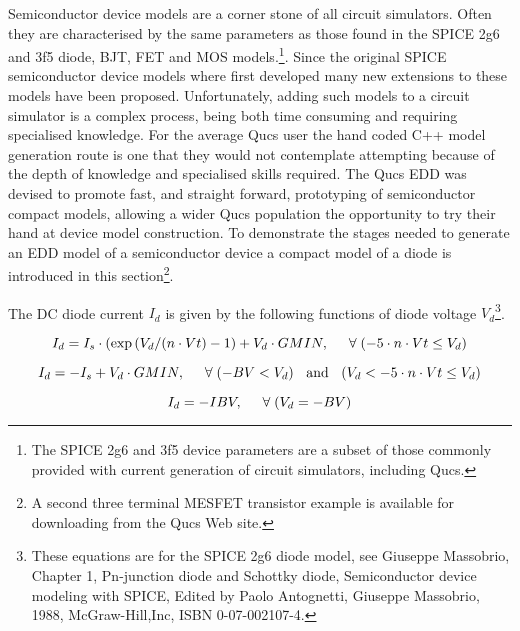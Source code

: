 Semiconductor device models are a corner stone of all circuit
simulators.  Often they are characterised by the same parameters as
those found in the SPICE 2g6 and 3f5 diode, BJT, FET and MOS
models.\footnote{The SPICE 2g6 and 3f5 device parameters are a subset
of those commonly provided with current generation of circuit
simulators, including Qucs.}.  Since the original SPICE semiconductor
device models where first developed many new extensions to these
models have been proposed.  Unfortunately, adding such models to a
circuit simulator is a complex process, being both time consuming and
requiring specialised knowledge. For the average Qucs user the hand
coded C++ model generation route is one that they would not
contemplate attempting because of the depth of knowledge and
specialised skills required. The Qucs EDD was devised to promote fast,
and straight forward, prototyping of semiconductor compact models,
allowing a wider Qucs population the opportunity to try their hand at
device model construction. To demonstrate the stages needed to
generate an EDD model of a semiconductor device a compact model of a
diode is introduced in this section\footnote{A second three terminal
MESFET transistor example is available for downloading from the Qucs
Web site.}.

\vspace{3mm}

The DC diode current $I_{d}$ is given by the following functions of
diode voltage $V_{d}$\footnote{These equations are for the SPICE 2g6
diode model, see Giuseppe Massobrio, Chapter 1, Pn-junction diode and
Schottky diode, Semiconductor device modeling with SPICE, Edited by
Paolo Antognetti, Giuseppe Massobrio, 1988, McGraw-Hill,Inc, ISBN
0-07-002107-4.}.


 \begin{equation}
I_{d} = I_{s}\cdot\left( \exp\left(V_{d}/(n\cdot Vt\right) -1 \right) +V_{d} \cdot GMIN,
\hspace{5mm}\forall\; (-5 \cdot n \cdot Vt \leq V_{d})
 \end{equation} 


\begin{equation}
 I_{d} = -I_{s}+V_{d}\cdot GMIN, \hspace{5mm}\forall\; (-BV <V_{d}) \hspace{2mm} \textrm{ and } \hspace{2mm} (V_{d} <-5 \cdot n \cdot Vt \leq V_{d})
\end{equation} 


\begin{equation}
 I_{d} = -IBV, \hspace{5mm}\forall\; (V_{d} = -BV)
\end{equation} 


